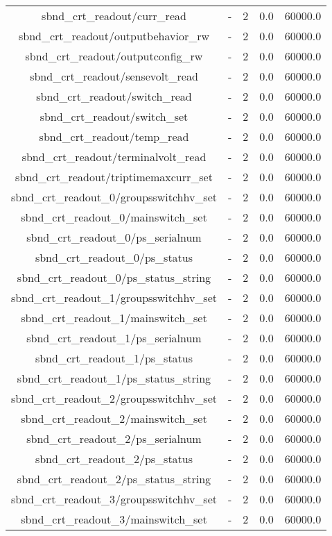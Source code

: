 \begin{center}
\begin{longtable}{c | c c c c }
sbnd\_crt\_readout/curr\_read & - & 2 & 0.0 & 60000.0\\ 
sbnd\_crt\_readout/outputbehavior\_rw & - & 2 & 0.0 & 60000.0\\ 
sbnd\_crt\_readout/outputconfig\_rw & - & 2 & 0.0 & 60000.0\\ 
sbnd\_crt\_readout/sensevolt\_read & - & 2 & 0.0 & 60000.0\\ 
sbnd\_crt\_readout/switch\_read & - & 2 & 0.0 & 60000.0\\ 
sbnd\_crt\_readout/switch\_set & - & 2 & 0.0 & 60000.0\\ 
sbnd\_crt\_readout/temp\_read & - & 2 & 0.0 & 60000.0\\ 
sbnd\_crt\_readout/terminalvolt\_read & - & 2 & 0.0 & 60000.0\\ 
sbnd\_crt\_readout/triptimemaxcurr\_set & - & 2 & 0.0 & 60000.0\\ 
sbnd\_crt\_readout\_0/groupsswitchhv\_set & - & 2 & 0.0 & 60000.0\\ 
sbnd\_crt\_readout\_0/mainswitch\_set & - & 2 & 0.0 & 60000.0\\ 
sbnd\_crt\_readout\_0/ps\_serialnum & - & 2 & 0.0 & 60000.0\\ 
sbnd\_crt\_readout\_0/ps\_status & - & 2 & 0.0 & 60000.0\\ 
sbnd\_crt\_readout\_0/ps\_status\_string & - & 2 & 0.0 & 60000.0\\ 
sbnd\_crt\_readout\_1/groupsswitchhv\_set & - & 2 & 0.0 & 60000.0\\ 
sbnd\_crt\_readout\_1/mainswitch\_set & - & 2 & 0.0 & 60000.0\\ 
sbnd\_crt\_readout\_1/ps\_serialnum & - & 2 & 0.0 & 60000.0\\ 
sbnd\_crt\_readout\_1/ps\_status & - & 2 & 0.0 & 60000.0\\ 
sbnd\_crt\_readout\_1/ps\_status\_string & - & 2 & 0.0 & 60000.0\\ 
sbnd\_crt\_readout\_2/groupsswitchhv\_set & - & 2 & 0.0 & 60000.0\\ 
sbnd\_crt\_readout\_2/mainswitch\_set & - & 2 & 0.0 & 60000.0\\ 
sbnd\_crt\_readout\_2/ps\_serialnum & - & 2 & 0.0 & 60000.0\\ 
sbnd\_crt\_readout\_2/ps\_status & - & 2 & 0.0 & 60000.0\\ 
sbnd\_crt\_readout\_2/ps\_status\_string & - & 2 & 0.0 & 60000.0\\ 
sbnd\_crt\_readout\_3/groupsswitchhv\_set & - & 2 & 0.0 & 60000.0\\ 
sbnd\_crt\_readout\_3/mainswitch\_set & - & 2 & 0.0 & 60000.0\\ 

\end{longtable}
\end{center}
